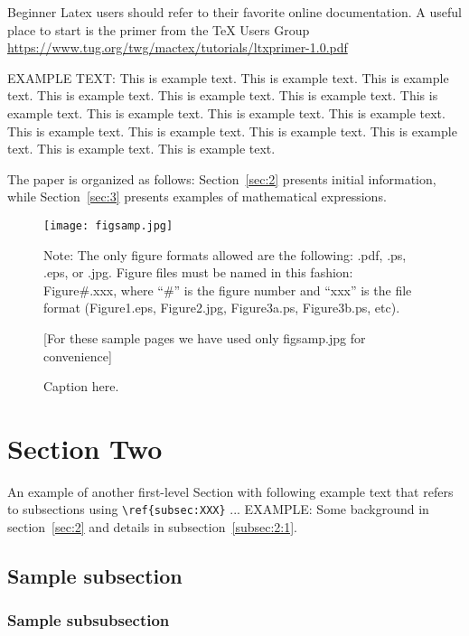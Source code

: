   Beginner Latex users should refer to their favorite online documentation. A
  useful place to start is the primer from the TeX Users Group
  \url{https://www.tug.org/twg/mactex/tutorials/ltxprimer-1.0.pdf}


EXAMPLE TEXT: This is example text. This is example text. This is example text. This is example text. This is example text. This is example text. This is example text. This is example text. This is example text. This is example text. This is example text. This is example text. This is example text. This is example text. This is example text. This is example text.

The paper is organized as follows: Section~\ref{sec:2} presents
initial information, while
Section~\ref{sec:3} presents examples of mathematical expressions.


\begin{figure}[ht]
\texttt{[image: figsamp.jpg]}
\caption{\label{fig:FIG1}{Caption here.}}

\raggedright
Note: The only figure formats allowed are the following:
.pdf, .ps, .eps, or .jpg. Figure files must be named in this fashion:
Figure\#.xxx, where ``\#'' is the figure number and ``xxx'' is the file format
(Figure1.eps, Figure2.jpg, Figure3a.ps, Figure3b.ps, etc).

[For these sample pages we have used only figsamp.jpg for convenience]
\end{figure}

\section{\label{sec:2} Section Two}

An example of another first-level Section with following example text that refers to subsections using
\verb+\ref{subsec:XXX}+ ...  EXAMPLE: Some background in
section~\ref{sec:2} and details  in subsection~\ref{subsec:2:1}.

\subsection{\label{subsec:2:1} Sample subsection}


   \subsubsection{Sample subsubsection\label{subsubsec:1}}

